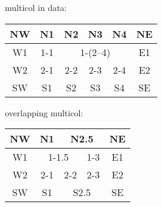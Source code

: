 \documentclass{article}
\begin{document}
multicol in data:\\
\begin{tabular}{|c|c|c|c|c|c|}\hline
NW&N1&N2&N3&N4&NE\\\hline
W1 & 1-1& \multicolumn{3}{|c|}{1-(2--4)} & E1\\\hline
W2 & 2-1 & 2-2 & 2-3 & 2-4 & E2 \\\hline
SW&S1&S2&S3&S4&SE\\\hline
\end{tabular}

overlapping multicol:\\
\begin{tabular}{|c|c|c|c|c|}\hline
NW&N1&\multicolumn{2}{|c|}{N2.5}&NE\\\hline
W1&\multicolumn{2}{|c|}{1-1.5}&1-3&E1\\\hline
W2&2-1&2-2&2-3&E2\\\hline
SW&S1&\multicolumn{2}{|c|}{S2.5}&SE\\\hline
\end{tabular}
\end{document}
